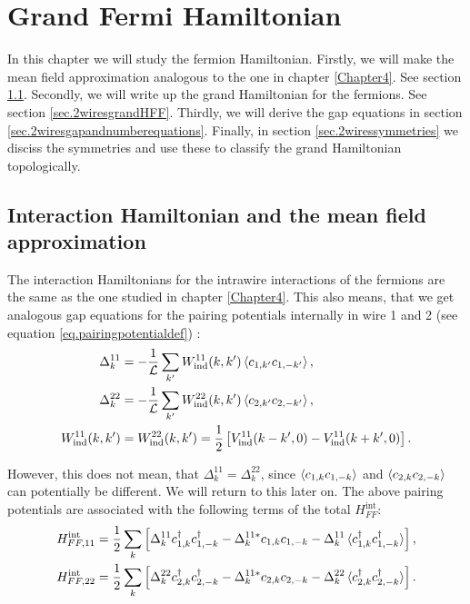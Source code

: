
\chapter{Grand Fermi Hamiltonian} %

\label{Chapter9} %


In this chapter we will study the fermion Hamiltonian. Firstly, we will make the mean field approximation analogous to the one in chapter \ref{Chapter4}. See section \ref{sec.2wiresmeanfieldapproximation}. Secondly, we will write up the grand Hamiltonian for the fermions. See section \ref{sec.2wiresgrandHFF}. Thirdly, we will derive the gap equations in section \ref{sec.2wiresgapandnumberequations}. Finally, in section \ref{sec.2wiressymmetries} we disciss the symmetries and use these to classify the grand Hamiltonian topologically. 

\section{Interaction Hamiltonian and the mean field approximation}
\label{sec.2wiresmeanfieldapproximation}
The interaction Hamiltonians for the intrawire interactions of the fermions are the same as the one studied in chapter \ref{Chapter4}. This also means, that we get analogous gap equations for the pairing potentials internally in wire 1 and 2 (see equation \ref{eq.pairingpotentialdef}) :
\begin{align}
\Delta^{11}_k &= -\frac{1}{\mathcal{L}} \sum_{k'} W_{\text{ind}}^{11}(k,k')\braket{c_{1,k'}c_{1,-k'}}, \nonumber \\
\Delta^{22}_k &= -\frac{1}{\mathcal{L}} \sum_{k'} W_{\text{ind}}^{22}(k,k')\braket{c_{2,k'}c_{2,-k'}}, \nonumber \\
W_{\text{ind}}^{11}(k,k') &= W_{\text{ind}}^{22}(k,k') = \frac{1}{2}\left[V_{\text{ind}}^{11}(k-k',0) - V_{\text{ind}}^{11}(k+k',0) \right].
\label{eq.pairingpotentialsintrawire}
\end{align}

However, this does not mean, that $\Delta^{11}_k = \Delta^{22}_k$, since $\braket{c_{1,k}c_{1,-k}}$ and $\braket{c_{2,k}c_{2,-k}}$ can potentially be different. We will return to this later on. The above pairing potentials are associated with the following terms of the total $H^\text{int}_{FF}$:
\begin{align}
H^\text{int}_{FF,11} &= \frac{1}{2}\sum_k \left[\Delta^{11}_k c^\dagger_{1,k}c^\dagger_{1,-k} - \Delta^{11 *}_k c_{1,k}c_{1,-k} - \Delta^{11}_k\braket{c^\dagger_{1,k}c^\dagger_{1,-k}} \right], \nonumber \\
H^\text{int}_{FF,22} &= \frac{1}{2}\sum_k \left[\Delta^{22}_k c^\dagger_{2,k}c^\dagger_{2,-k} - \Delta^{11 *}_k c_{2,k}c_{2,-k} - \Delta^{22}_k\braket{c^\dagger_{2,k}c^\dagger_{2,-k}} \right].
\label{eq.Hintintrawire}
\end{align}

